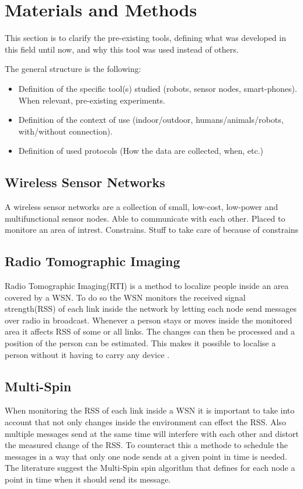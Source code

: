 \chapter{Materials and Methods}

This section is to clarify the pre-existing tools, defining what was developed in this field until now, and why this tool was used instead of others.

The general structure is the following:
\begin{itemize}
	\item Definition of the specific tool(s) studied (robots, sensor nodes, smart-phones). When relevant, pre-existing experiments.
	\item Definition of the context of use (indoor/outdoor, humans/animals/robots, with/without connection).
	\item Definition of used protocols (How the data are collected, when, etc.)
\end{itemize}

\section{Wireless Sensor Networks}
A wireless sensor networks are a collection of small, low-cost, low-power and multifunctional sensor nodes.
Able to communicate with each other. 
Placed to monitore an area of intrest.
Constrains.
Stuff to take care of because of constrains
\section{Radio Tomographic Imaging}
Radio Tomographic Imaging(RTI) is a method to localize people inside an area covered by a WSN. To do so the WSN monitors the received signal strength(RSS) of each link inside the network by letting each node send messages over radio in broadcast. Whenever a person stays or moves inside the monitored area it affects RSS of some or all links. The changes can then be processed and a position of the person can be estimated. This makes it possible to localise a person without it having to carry any device \cite{RtiMulti}.
\section{Multi-Spin}
When monitoring the RSS of each link inside a WSN it is important to take into account that not only changes inside the environment can effect the RSS. Also multiple messages send at the same time will interfere with each other and distort the measured change of the RSS. To counteract this a methode to schedule the messages in a way that only one node sends at a given point in time is needed. The literature suggest the Multi-Spin spin algorithm that defines for each node a point in time when it should send its message.

